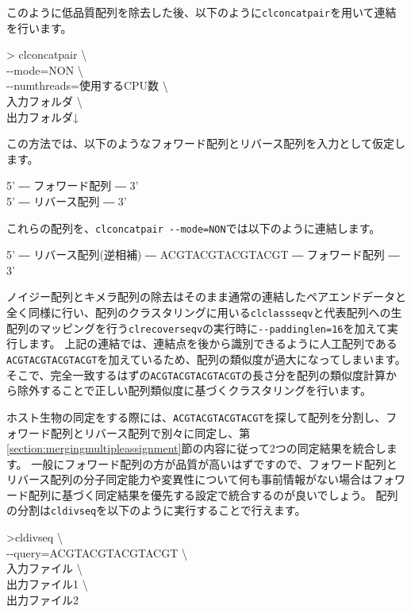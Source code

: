 \documentclass[titlepage,10pt,a4paper]{jsbook}
\newenvironment{pre}{\begin{leftbar}\raggedright\ttfamily\footnotesize\setlength{\baselineskip}{1.4em}}{\end{leftbar}\vspace{-1em}}
\newenvironment{cmd}{\begin{oframed}\raggedright\ttfamily\footnotesize\setlength{\baselineskip}{1.4em}}{\end{oframed}\vspace{-1em}}
\begin{document}
このように低品質配列を除去した後、以下のように\texttt{clconcatpair}を用いて連結を行います。

\begin{cmd}
{\textgreater} clconcatpair {\textbackslash}\\
{-}{-}mode=NON {\textbackslash}\\
{-}{-}numthreads=使用するCPU数 {\textbackslash}\\
入力フォルダ {\textbackslash}\\
出力フォルダ↓
\end{cmd}

この方法では、以下のようなフォワード配列とリバース配列を入力として仮定します。

\begin{pre}
5' ― フォワード配列 ― 3'\\
5' ― リバース配列 ― 3'
\end{pre}

これらの配列を、\texttt{clconcatpair {-}{-}mode=NON}では以下のように連結します。

\begin{pre}
5' ― リバース配列(逆相補) ― ACGTACGTACGTACGT ― フォワード配列 ― 3'
\end{pre}

ノイジー配列とキメラ配列の除去はそのまま通常の連結したペアエンドデータと全く同様に行い、配列のクラスタリングに用いる\texttt{clclassseqv}と代表配列への生配列のマッピングを行う\texttt{clrecoverseqv}の実行時に\texttt{{-}{-}paddinglen=16}を加えて実行します。
上記の連結では、連結点を後から識別できるように人工配列である\texttt{ACGTACGTACGTACGT}を加えているため、配列の類似度が過大になってしまいます。
そこで、完全一致するはずの\texttt{ACGTACGTACGTACGT}の長さ分を配列の類似度計算から除外することで正しい配列類似度に基づくクラスタリングを行います。

ホスト生物の同定をする際には、\texttt{ACGTACGTACGTACGT}を探して配列を分割し、フォワード配列とリバース配列で別々に同定し、第\ref{section:mergingmultipleassignment}節の内容に従って2つの同定結果を統合します。
一般にフォワード配列の方が品質が高いはずですので、フォワード配列とリバース配列の分子同定能力や変異性について何も事前情報がない場合はフォワード配列に基づく同定結果を優先する設定で統合するのが良いでしょう。
配列の分割は\texttt{cldivseq}を以下のように実行することで行えます。

\begin{cmd}
{\textgreater}cldivseq {\textbackslash}\\
{-}{-}query=ACGTACGTACGTACGT {\textbackslash}\\
入力ファイル {\textbackslash}\\
出力ファイル1 {\textbackslash}\\
出力ファイル2
\end{cmd}
\end{document}
